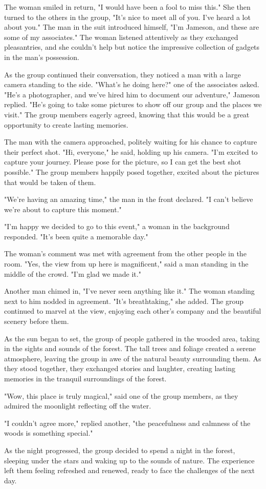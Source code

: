 \documentclass[smalldemyvopaper,11pt,twoside,onecolumn,openright,extrafontsizes]{memoir}
\begin{document}
The woman smiled in return, "I would have been a fool to miss this." She then turned to the others in the group, "It's nice to meet all of you. I've heard a lot about you." The man in the suit introduced himself, "I'm Jameson, and these are some of my associates." The woman listened attentively as they exchanged pleasantries, and she couldn't help but notice the impressive collection of gadgets in the man's possession.\par
As the group continued their conversation, they noticed a man with a large camera standing to the side. "What's he doing here?" one of the associates asked. "He's a photographer, and we've hired him to document our adventure," Jameson replied. "He's going to take some pictures to show off our group and the places we visit." The group members eagerly agreed, knowing that this would be a great opportunity to create lasting memories.\par
The man with the camera approached, politely waiting for his chance to capture their perfect shot. "Hi, everyone," he said, holding up his camera. "I'm excited to capture your journey. Please pose for the picture, so I can get the best shot possible." The group members happily posed together, excited about the pictures that would be taken of them.\par
"We're having an amazing time," the man in the front declared. "I can't believe we're about to capture this moment."\par
"I'm happy we decided to go to this event," a woman in the background responded. "It's been quite a memorable day."\par
The woman's comment was met with agreement from the other people in the room. "Yes, the view from up here is magnificent," said a man standing in the middle of the crowd. "I'm glad we made it."\par
Another man chimed in, "I've never seen anything like it." The woman standing next to him nodded in agreement. "It's breathtaking," she added. The group continued to marvel at the view, enjoying each other's company and the beautiful scenery before them.\par
As the sun began to set, the group of people gathered in the wooded area, taking in the sights and sounds of the forest. The tall trees and foliage created a serene atmosphere, leaving the group in awe of the natural beauty surrounding them. As they stood together, they exchanged stories and laughter, creating lasting memories in the tranquil surroundings of the forest.\par
"Wow, this place is truly magical," said one of the group members, as they admired the moonlight reflecting off the water.\par
"I couldn't agree more," replied another, "the peacefulness and calmness of the woods is something special."\par
As the night progressed, the group decided to spend a night in the forest, sleeping under the stars and waking up to the sounds of nature. The experience left them feeling refreshed and renewed, ready to face the challenges of the next day.\par
\end{document}
